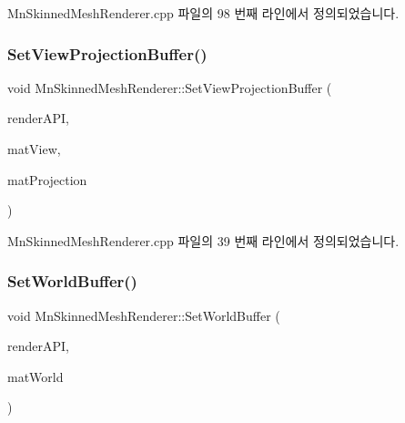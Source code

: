Mn\+Skinned\+Mesh\+Renderer.\+cpp 파일의 98 번째 라인에서 정의되었습니다.

\mbox{\label{class_m_n_l_1_1_mn_skinned_mesh_renderer_a37ec060d1a3f351868732fc76ae07200}} 
\subsubsection{\texorpdfstring{Set\+View\+Projection\+Buffer()}{SetViewProjectionBuffer()}}
{\footnotesize\ttfamily void Mn\+Skinned\+Mesh\+Renderer\+::\+Set\+View\+Projection\+Buffer (\begin{DoxyParamCaption}\item[{\hyperlink{class_m_n_l_1_1_mn_render_a_p_i}{Mn\+Render\+A\+PI} \&}]{render\+A\+PI,  }\item[{const Direct\+X\+::\+Simple\+Math\+::\+Matrix \&}]{mat\+View,  }\item[{const Direct\+X\+::\+Simple\+Math\+::\+Matrix \&}]{mat\+Projection }\end{DoxyParamCaption})}



Mn\+Skinned\+Mesh\+Renderer.\+cpp 파일의 39 번째 라인에서 정의되었습니다.

\mbox{\label{class_m_n_l_1_1_mn_skinned_mesh_renderer_a68ee7deacb177b3fe1c40ef6c54656ad}} 
\subsubsection{\texorpdfstring{Set\+World\+Buffer()}{SetWorldBuffer()}}
{\footnotesize\ttfamily void Mn\+Skinned\+Mesh\+Renderer\+::\+Set\+World\+Buffer (\begin{DoxyParamCaption}\item[{\hyperlink{class_m_n_l_1_1_mn_render_a_p_i}{Mn\+Render\+A\+PI} \&}]{render\+A\+PI,  }\item[{const Direct\+X\+::\+Simple\+Math\+::\+Matrix \&}]{mat\+World }\end{DoxyParamCaption})}



